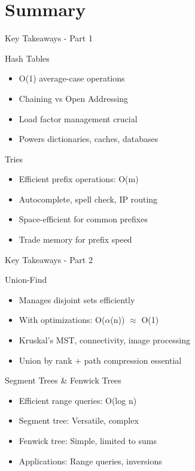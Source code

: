 \documentclass[aspectratio=169,xcolor=dvipsnames]{beamer}
\begin{document}
\section{Summary}

\begin{frame}{Key Takeaways - Part 1}
  \begin{block}{Hash Tables}
    \begin{itemize}
      \item O(1) average-case operations
      \item Chaining vs Open Addressing
      \item Load factor management crucial
      \item Powers dictionaries, caches, databases
    \end{itemize}
  \end{block}

  \begin{block}{Tries}
    \begin{itemize}
      \item Efficient prefix operations: O(m)
      \item Autocomplete, spell check, IP routing
      \item Space-efficient for common prefixes
      \item Trade memory for prefix speed
    \end{itemize}
  \end{block}
\end{frame}

\begin{frame}{Key Takeaways - Part 2}
  \begin{block}{Union-Find}
    \begin{itemize}
      \item Manages disjoint sets efficiently
      \item With optimizations: O($\alpha$(n)) $\approx$ O(1)
      \item Kruskal's MST, connectivity, image processing
      \item Union by rank + path compression essential
    \end{itemize}
  \end{block}

  \begin{block}{Segment Trees \& Fenwick Trees}
    \begin{itemize}
      \item Efficient range queries: O(log n)
      \item Segment tree: Versatile, complex
      \item Fenwick tree: Simple, limited to sums
      \item Applications: Range queries, inversions
    \end{itemize}
  \end{block}
\end{frame}
\end{document}
